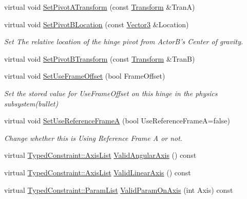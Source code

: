 \begin{DoxyCompactItemize}
virtual void \hyperlink{classMezzanine_1_1HingeConstraint_a44bc111ce8642c52c106af2cfe1fd7d5}{SetPivotATransform} (const \hyperlink{classMezzanine_1_1Transform}{Transform} \&TranA)
\item 
virtual void \hyperlink{classMezzanine_1_1HingeConstraint_a7ae57514d6bd1119859ecb137cf58e5e}{SetPivotBLocation} (const \hyperlink{classMezzanine_1_1Vector3}{Vector3} \&Location)
\begin{DoxyCompactList}\small\item\em Set The relative location of the hinge pivot from ActorB's Center of gravity. \item\end{DoxyCompactList}\item 
virtual void \hyperlink{classMezzanine_1_1HingeConstraint_abbe27830e0d17c44125cee59d84a9d37}{SetPivotBTransform} (const \hyperlink{classMezzanine_1_1Transform}{Transform} \&TranB)
\item 
virtual void \hyperlink{classMezzanine_1_1HingeConstraint_a9a77fd9be29d97313e6a014d4e110697}{SetUseFrameOffset} (bool FrameOffset)
\begin{DoxyCompactList}\small\item\em Set the stored value for UseFrameOffset on this hinge in the physics subsystem(bullet) \item\end{DoxyCompactList}\item 
virtual void \hyperlink{classMezzanine_1_1HingeConstraint_a94a8a1c4b6febf1ca8859e7d3bf3c5ca}{SetUseReferenceFrameA} (bool UseReferenceFrameA=false)
\begin{DoxyCompactList}\small\item\em Change whether this is Using Reference Frame A or not. \item\end{DoxyCompactList}\item 
virtual \hyperlink{classMezzanine_1_1TypedConstraint_ac6b8e0839cd686f73d0c9e9ad5db47a4}{TypedConstraint::AxisList} \hyperlink{classMezzanine_1_1HingeConstraint_aaed95fc3750346a6f9791b025e600aa0}{ValidAngularAxis} () const 
\item 
virtual \hyperlink{classMezzanine_1_1TypedConstraint_ac6b8e0839cd686f73d0c9e9ad5db47a4}{TypedConstraint::AxisList} \hyperlink{classMezzanine_1_1HingeConstraint_a2af69ea5320ff27bf4d5de7ae9530594}{ValidLinearAxis} () const 
\item 
virtual \hyperlink{classMezzanine_1_1TypedConstraint_abd499db29c9e9755e9bb547d29eaa49a}{TypedConstraint::ParamList} \hyperlink{classMezzanine_1_1HingeConstraint_a3ea048fe9e7eda83e4ef42174a0c6157}{ValidParamOnAxis} (int Axis) const 
\end{DoxyCompactItemize}
